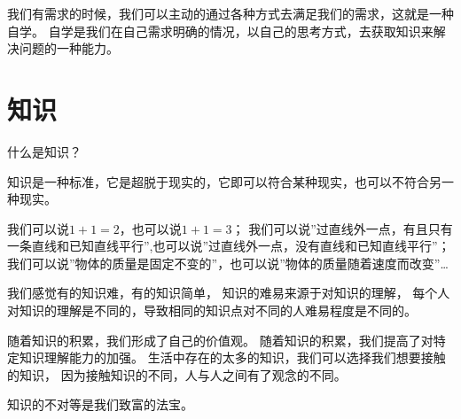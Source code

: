 我们有需求的时候，我们可以主动的通过各种方式去满足我们的需求，这就是一种自学。
自学是我们在自己需求明确的情况，以自己的思考方式，去获取知识来解决问题的一种能力。







\section{知识}
什么是知识？

知识是一种标准，它是超脱于现实的，它即可以符合某种现实，也可以不符合另一种现实。

我们可以说$1+1=2$，也可以说$1+1=3$；
我们可以说''过直线外一点，有且只有一条直线和已知直线平行'',也可以说''过直线外一点，没有直线和已知直线平行''；
我们可以说''物体的质量是固定不变的''，也可以说''物体的质量随着速度而改变''\dots



我们感觉有的知识难，有的知识简单，
知识的难易来源于对知识的理解，
每个人对知识的理解是不同的，导致相同的知识点对不同的人难易程度是不同的。

随着知识的积累，我们形成了自己的价值观。
随着知识的积累，我们提高了对特定知识理解能力的加强。
生活中存在的太多的知识，我们可以选择我们想要接触的知识，
因为接触知识的不同，人与人之间有了观念的不同。

知识的不对等是我们致富的法宝。